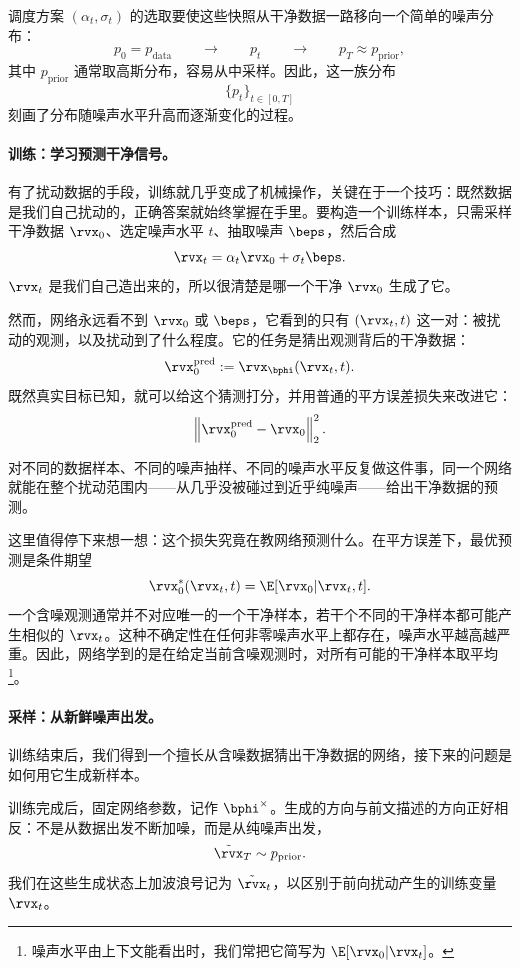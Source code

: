 调度方案 $(\alpha_t,\sigma_t)$ 的选取要使这些快照从干净数据一路移向一个简单的噪声分布：
\[
p_0=p_{\mathrm{data}}
\qquad\longrightarrow\qquad
p_t
\qquad\longrightarrow\qquad
p_T\approx p_{\mathrm{prior}},
\]
其中 $p_{\mathrm{prior}}$ 通常取高斯分布，容易从中采样。因此，这一族分布
\[
\{p_t\}_{t\in[0,T]}
\]
刻画了分布随噪声水平升高而逐渐变化的过程。


\paragraph{训练：学习预测干净信号。}

有了扰动数据的手段，训练就几乎变成了机械操作，关键在于一个技巧：既然数据是我们自己扰动的，正确答案就始终掌握在手里。要构造一个训练样本，只需采样干净数据 $\rvx_0$、选定噪声水平
$t$、抽取噪声 $\beps$，然后合成
\[
\rvx_t
=
\alpha_t\rvx_0+\sigma_t\beps.
\]
$\rvx_t$ 是我们自己造出来的，所以很清楚是哪一个干净 $\rvx_0$ 生成了它。

然而，网络永远看不到 $\rvx_0$ 或 $\beps$，它看到的只有
$(\rvx_t,t)$ 这一对：被扰动的观测，以及扰动到了什么程度。它的任务是猜出观测背后的干净数据：
\[
\rvx_0^{\mathrm{pred}}
:=
\rvx_{\bphi}(\rvx_t,t).
\]
既然真实目标已知，就可以给这个猜测打分，并用普通的平方误差损失来改进它：
\[
\left\|
\rvx_0^{\mathrm{pred}}-\rvx_0
\right\|_2^2.
\]


对不同的数据样本、不同的噪声抽样、不同的噪声水平反复做这件事，同一个网络就能在整个扰动范围内——从几乎没被碰过到近乎纯噪声——给出干净数据的预测。

这里值得停下来想一想：这个损失究竟在教网络预测什么。在平方误差下，最优预测是条件期望
\[
\rvx_0^*(\rvx_t,t)
=
\E[\rvx_0|\rvx_t,t].
\]
一个含噪观测通常并不对应唯一的一个干净样本，若干个不同的干净样本都可能产生相似的 $\rvx_t$。这种不确定性在任何非零噪声水平上都存在，噪声水平越高越严重。因此，网络学到的是在给定当前含噪观测时，对所有可能的干净样本取平均\footnote{噪声水平由上下文能看出时，我们常把它简写为 $\E[\rvx_0|\rvx_t]$。}。

\paragraph{采样：从新鲜噪声出发。}

训练结束后，我们得到一个擅长从含噪数据猜出干净数据的网络，接下来的问题是如何用它生成新样本。

训练完成后，固定网络参数，记作 $\bphi^\times$。生成的方向与前文描述的方向正好相反：不是从数据出发不断加噪，而是从纯噪声出发，
\[
\tilde{\rvx}_T\sim p_{\mathrm{prior}}.
\]
我们在这些生成状态上加波浪号记为 $\tilde{\rvx}_t$，以区别于前向扰动产生的训练变量 $\rvx_t$。

